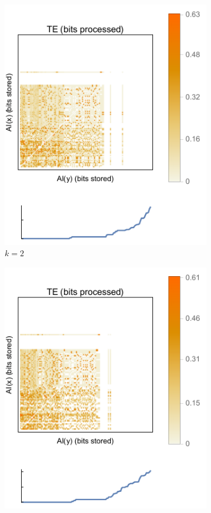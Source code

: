 \documentclass[twoside]{article}
\begin{document}
\begin{multicols}{2}
\begin{figure}
\centering
\begin{subfigure}{.5\textwidth}
  \centering
  \includegraphics[width=0.9\linewidth]{winrate_AI_vs_AI_vs_TE_Heatmap_k2.pdf}
  \caption{$k=2$}
  \label{fig:sub1}
\end{subfigure}%
\begin{subfigure}{.5\textwidth}
  \centering
  \includegraphics[width=0.9\linewidth]{winrate_AI_vs_AI_vs_TE_Heatmap_k3.pdf}

\end{subfigure}
\end{figure}
\end{multicols}
\end{document}
